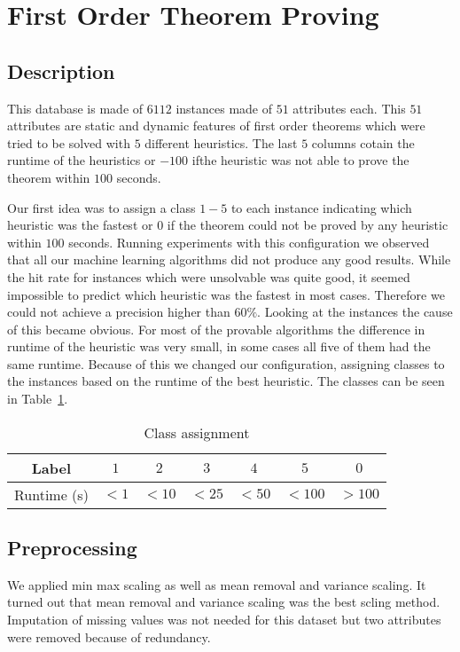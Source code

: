 \section{First Order Theorem Proving}
\label{db:sec:ds2}
\subsection{Description}
This database is made of $6112$ instances made of $51$ attributes each. This $51$ attributes are static and dynamic features of first order theorems which were tried to be solved with $5$ different heuristics. The last $5$ columns cotain the runtime of the heuristics or $-100$ ifthe heuristic was not able to prove the theorem within $100$ seconds.\par
Our first idea was to assign a class $1-5$ to each instance indicating which heuristic was the fastest or $0$ if the theorem could not be proved by any heuristic within $100$ seconds. Running experiments with this configuration we observed that all our machine learning algorithms did not produce any good results. While the hit rate for instances which were unsolvable was quite good, it seemed impossible to predict which heuristic was the fastest in most cases. Therefore we could not achieve a precision higher than $60\%$.
Looking at the instances the cause of this became obvious. For most of the provable algorithms the difference in runtime of the heuristic was very small, in some cases all five of them had the same runtime. Because of this we changed our configuration, assigning classes to the instances based on the runtime of the best heuristic. The classes can be seen in Table~\ref{ds2:table:classes}.
\begin{table}[h]
	\begin{center}
	\begin{tabular}{c|c|c|c|c|c|c}

		Label & $1$ & $2$ & $3$ & $4$ & $5$& $0$\\\hline
		Runtime (s) & $<1$ & $<10$ & $<25$ & $<50$ &$<100$ &$>100$\\
	\end{tabular}
\end{center}
	\caption{Class assignment \label{ds2:table:classes}}
\end{table}
\subsection{Preprocessing}
We applied min max scaling as well as mean removal and variance scaling. It turned out that mean removal and variance scaling was the best scling method. Imputation of missing values was not needed for this dataset but two attributes were removed because of redundancy.
